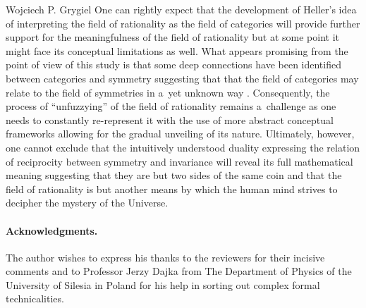\begin{artengenv}{Wojciech P. Grygiel}
One can rightly expect that the development of Heller's idea of interpreting the field of rationality as the field of categories will provide further support for the meaningfulness of the field of rationality but at some point it might face its conceptual limitations as well. What appears promising from the point of view of this study is that some deep connections have been identified between categories and symmetry suggesting that that the field of categories may relate to the field of symmetries in a~yet unknown way 
\parencite[e.g][]{heunen_principle_2008}. %
 Consequently, the process of ``unfuzzying'' of the field of rationality remains a~challenge as one needs to constantly re-represent it with the use of more abstract conceptual frameworks allowing for the gradual unveiling of its nature. Ultimately, however, one cannot exclude that the intuitively understood duality expressing the relation of reciprocity between symmetry and invariance will reveal its full mathematical meaning suggesting that they are but two sides of the same coin and that the field of rationality is but another means by which the human mind strives to decipher the mystery of the Universe.


\enlargethispage{1.5\baselineskip}
\paragraph{Acknowledgments.}
The author wishes to express his thanks to the reviewers for their incisive comments and to Professor Jerzy Dajka from The Department of Physics of the University of Silesia in Poland for his help in sorting out complex formal technicalities.



\end{artengenv}
